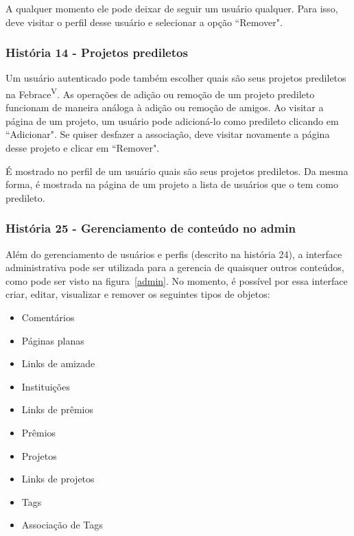       A qualquer momento ele pode deixar de seguir um usuário qualquer. Para isso, deve visitar o perfil desse usuário e selecionar a opção “Remover".

    \subsubsection{História 14 - Projetos prediletos}
      Um usuário autenticado pode também escolher quais são seus projetos prediletos na Febrace\textsuperscript{V}. As operações de adição ou remoção de um projeto predileto funcionam de maneira análoga à adição ou remoção de amigos. Ao visitar a página de um projeto, um usuário pode adicioná-lo como predileto clicando em “Adicionar". Se quiser desfazer a associação, deve visitar novamente a página desse projeto e clicar em “Remover".

      É mostrado no perfil de um usuário quais são seus projetos prediletos. Da mesma forma, é mostrada na página de um projeto a lista de usuários que o tem como predileto.

    \subsubsection{História 25 - Gerenciamento de conteúdo no admin}
      Além do gerenciamento de usuários e perfis (descrito na história 24), a interface administrativa pode ser utilizada para a gerencia de quaisquer outros conteúdos, como pode ser visto na figura~\ref{admin}. No momento, é possível por essa interface criar, editar, visualizar e remover os seguintes tipos de objetos:

      \begin{multicols}{3}
      \begin{itemize}
        \item{Comentários}
        \item{Páginas planas}
        \item{Links de amizade}
        \item{Instituições}
        \item{Links de prêmios}
        \item{Prêmios}
        \item{Projetos}
        \item{Links de projetos}
        \item{Tags}
        \item{Associação de Tags}
      \end{itemize}
      \end{multicols}

